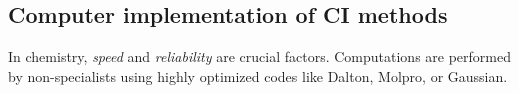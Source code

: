 \documentclass{report}
\theoremstyle{plain}
\theoremstyle{definition}
\newcommand{\note}[1]{{\color{red}\emph{NB:}~#1}}
\newcommand{\programname}[1]{{\sc#1}}
\begin{document}




\subsection{Computer implementation of CI methods}

In chemistry, \emph{speed} and \emph{reliability} are crucial
factors. Computations are performed by non-specialists using highly
optimized codes like \programname{Dalton}, \programname{Molpro}, or
\programname{Gaussian}.
\end{document}

